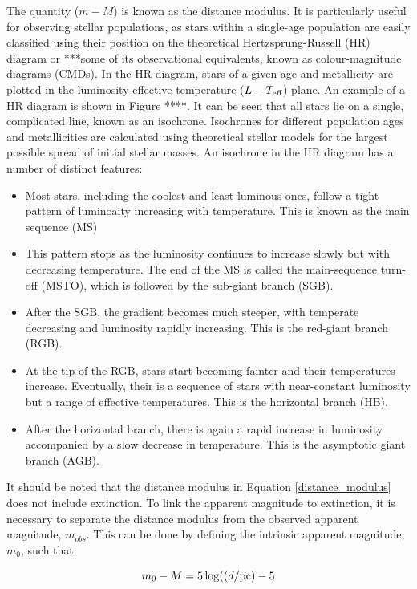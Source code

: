 \documentclass[a4paper, 11pt, oneside]{LJMU_Astro_Thesis}  %
\begin{document}
The quantity ($m - M$) is known as the distance modulus. It is particularly useful for observing stellar populations, as stars within a single-age population are easily classified using their position on the theoretical Hertzsprung-Russell (HR) diagram or ***some of its observational equivalents, known as colour-magnitude diagrams (CMDs). In the HR diagram, stars of a given age and metallicity are plotted in the luminosity-effective temperature ($L-T_{\textnormal{eff}}$) plane. An example of a HR diagram is shown in Figure ****. It can be seen that all stars lie on a single, complicated line, known as an isochrone. Isochrones for different population ages and metallicities are calculated using theoretical stellar models for the largest possible spread of initial stellar masses. An isochrone in the HR diagram has a number of distinct features:
\begin{itemize}
\item Most stars, including the coolest and least-luminous ones, follow a tight pattern of luminoaity increasing with temperature. This is known as the main sequence (MS)
\item This pattern stops as the luminosity continues to increase slowly but with decreasing temperature. The end of the MS is called the main-sequence turn-off (MSTO), which is followed by the sub-giant branch (SGB).
\item After the SGB, the gradient becomes much steeper, with temperate decreasing and luminosity rapidly increasing. This is the red-giant branch (RGB).
\item At the tip of the RGB, stars start becoming fainter and their temperatures increase. Eventually, their is a sequence of stars with near-constant luminosity but a range of effective temperatures. This is the horizontal branch (HB).
\item After the horizontal branch, there is again a rapid increase in luminosity accompanied by a slow decrease in temperature. This is the asymptotic giant branch (AGB).
\end{itemize}

It should be noted that the distance modulus in Equation \ref{distance_modulus} does not include extinction. To link the apparent magnitude to extinction, it is necessary to separate the distance modulus from the observed apparent magnitude, $m_{obs}$. This can be done by defining the intrinsic apparent magnitude, $m_{0}$, such that:

\begin{equation}
\label{intrinsic_app_mag}
m_{0} - M = 5\log( (d/\textnormal{pc}) - 5
\end{equation}
\end{document}
